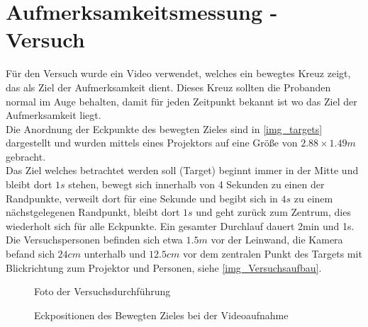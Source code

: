 \section{Aufmerksamkeitsmessung - Versuch}
\label{VideoAnalyse}
Für den Versuch wurde ein Video verwendet, welches ein bewegtes Kreuz zeigt, das als Ziel der Aufmerksamkeit dient. Dieses Kreuz sollten die Probanden normal im Auge behalten, damit für jeden Zeitpunkt bekannt ist wo das Ziel der Aufmerksamkeit liegt.\\
Die Anordnung der Eckpunkte des bewegten Zieles sind in \autoref{img_targets} dargestellt und wurden mittels eines Projektors auf eine Größe von $2.88 \times 1.49 m$ gebracht.\\
Das Ziel welches betrachtet werden soll (Target) beginnt immer in der Mitte und bleibt dort $1s$ stehen, bewegt sich innerhalb von 4 Sekunden zu einen der Randpunkte, verweilt dort für eine Sekunde und begibt sich in $4s$ zu einem nächstgelegenen Randpunkt, bleibt dort $1s$ und geht zurück zum Zentrum, dies wiederholt sich für alle Eckpunkte. Ein gesamter Durchlauf dauert 2min und 1s.\\
Die Versuchspersonen befinden sich etwa $1.5m$ vor der Leinwand, die Kamera befand sich $24cm$ unterhalb und $12.5cm$ vor dem zentralen Punkt des Targets mit Blickrichtung zum Projektor und Personen, siehe \autoref{img_Versuchsaufbau}.
\begin{figure}
	\centering
	\caption{Foto der Versuchsdurchführung}
	\label{img_Versuchsaufbau}
\end{figure}
\begin{figure}
\centering
{}
\caption{Eckpositionen des Bewegten Zieles bei der Videoaufnahme}
\label{img_targets}
\end{figure}
